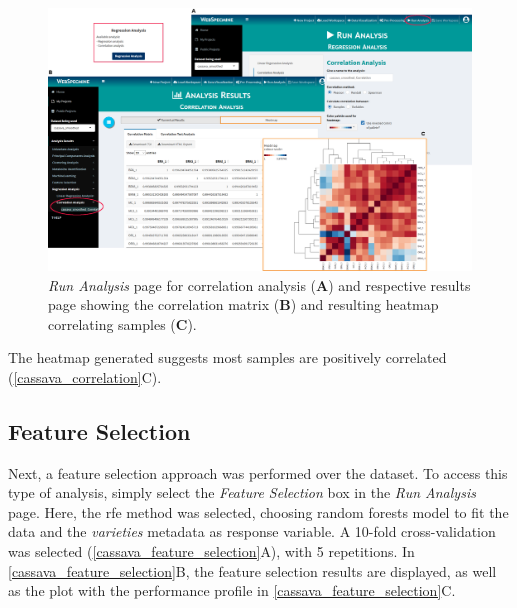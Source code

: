 \begin{figure}[H]
	\centering
	\includegraphics[width=1\linewidth]{Imagens/CassavaPPD/correlation}
	\caption{\textit{Run Analysis} page for correlation analysis (\textbf{A}) and respective results page showing the correlation matrix (\textbf{B}) and resulting heatmap correlating samples (\textbf{C}).}
	\label{cassava_correlation}
\end{figure}

The heatmap generated suggests most samples are positively correlated (\autoref{cassava_correlation}C).


\subsection{Feature Selection}

Next, a feature selection approach was performed over the dataset. To access this type of analysis, simply select the \textit{Feature Selection} box in the \textit{Run Analysis} page. Here, the \gls{rfe} method was selected, choosing random forests model to fit the data and the \textit{varieties} metadata as response variable. A 10-fold cross-validation was selected (\autoref{cassava_feature_selection}A), with 5 repetitions. In \autoref{cassava_feature_selection}B, the feature selection results are displayed, as well as the plot with the performance profile in \autoref{cassava_feature_selection}C. 


